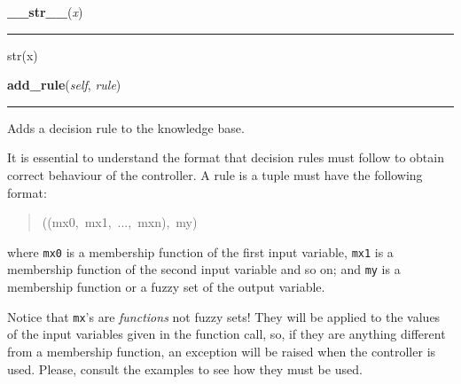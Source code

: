     \vspace{0.5ex}

    \begin{boxedminipage}{\textwidth}

    \raggedright \textbf{\_\_str\_\_}(\textit{x})

    \vspace{-1.5ex}

    \rule{\textwidth}{0.5\fboxrule}

str(x)
    \vspace{1ex}

    \end{boxedminipage}

    \label{peach:fuzzy:control:Controller:add_rule}

    \vspace{0.5ex}

    \begin{boxedminipage}{\textwidth}

    \raggedright \textbf{add\_rule}(\textit{self}, \textit{rule})

    \vspace{-1.5ex}

    \rule{\textwidth}{0.5\fboxrule}

Adds a decision rule to the knowledge base.

It is essential to understand the format that decision rules must follow
to obtain correct behaviour of the controller. A rule is a tuple must
have the following format:
\begin{quote}{\ttfamily \raggedright \noindent
((mx0,~mx1,~...,~mxn),~my)
}\end{quote}

where \texttt{mx0} is a membership function of the first input variable,
\texttt{mx1} is a membership function of the second input variable and so on;
and \texttt{my} is a membership function or a fuzzy set of the output
variable.

Notice that \texttt{mx}'s are \emph{functions} not fuzzy sets! They will be
applied to the values of the input variables given in the function call,
so, if they are anything different from a membership function, an
exception will be raised when the controller is used. Please, consult
the examples to see how they must be used.
    \vspace{1ex}

    \end{boxedminipage}

